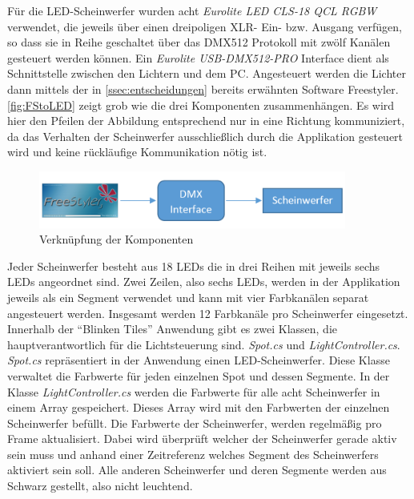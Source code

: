 \label{ssec:DMX}

Für die LED-Scheinwerfer wurden acht \emph{Eurolite LED CLS-18 QCL RGBW} verwendet, die jeweils über einen dreipoligen XLR- Ein- bzw. Ausgang verfügen, so dass sie in Reihe geschaltet über das DMX512 Protokoll mit zwölf Kanälen gesteuert werden können. Ein \emph{Eurolite USB-DMX512-PRO} Interface dient als Schnittstelle zwischen den Lichtern und dem PC. Angesteuert werden die Lichter dann mittels der in \autoref{ssec:entscheidungen} bereits erwähnten Software Freestyler. \autoref{fig:FStoLED} zeigt grob wie die drei Komponenten zusammenhängen. Es wird hier den Pfeilen der Abbildung entsprechend nur in eine Richtung kommuniziert, da das Verhalten der Scheinwerfer ausschließlich durch die Applikation gesteuert wird und keine rückläufige Kommunikation nötig ist.
\begin{figure}[htbp]
	\centering
		\includegraphics[width=0.90\textwidth]{images/FStoDMXInterfaceToLEDs.PNG}
	\caption{Verknüpfung der Komponenten}
	\label{fig:FStoLED}
\end{figure}
Jeder Scheinwerfer besteht aus 18 LEDs die in drei Reihen mit jeweils sechs LEDs angeordnet sind. Zwei Zeilen, also sechs LEDs, werden in der Applikation jeweils als ein Segment verwendet und kann mit vier Farbkanälen separat angesteuert werden. Insgesamt werden 12 Farbkanäle pro Scheinwerfer eingesetzt. Innerhalb der "`Blinken Tiles"' Anwendung gibt es zwei Klassen, die hauptverantwortlich für die Lichtsteuerung sind. \emph{Spot.cs} und \emph{LightController.cs}. \emph{Spot.cs} repräsentiert in der Anwendung einen LED-Scheinwerfer. Diese Klasse verwaltet die Farbwerte für jeden einzelnen Spot und dessen Segmente. In der Klasse \emph{LightController.cs} werden die Farbwerte für alle acht Scheinwerfer in einem Array gespeichert. Dieses Array wird mit den Farbwerten der einzelnen Scheinwerfer befüllt. Die Farbwerte der Scheinwerfer, werden regelmäßig pro Frame aktualisiert. Dabei wird überprüft welcher der Scheinwerfer gerade aktiv sein muss und anhand einer Zeitreferenz welches Segment des Scheinwerfers aktiviert sein soll. Alle anderen Scheinwerfer und deren Segmente werden aus Schwarz gestellt, also nicht leuchtend. 

